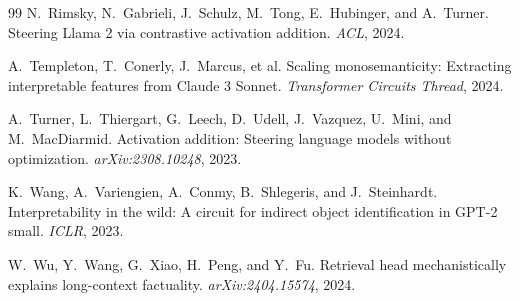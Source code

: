 \documentclass[11pt]{article}
\theoremstyle{definition}
\theoremstyle{plain}
\theoremstyle{remark}
\begin{document}
\begin{thebibliography}{99}
N.~Rimsky, N.~Gabrieli, J.~Schulz, M.~Tong, E.~Hubinger, and A.~Turner.
\newblock Steering Llama 2 via contrastive activation addition.
\newblock \emph{ACL}, 2024.

A.~Templeton, T.~Conerly, J.~Marcus, et al.
\newblock Scaling monosemanticity: Extracting interpretable features from Claude 3 Sonnet.
\newblock \emph{Transformer Circuits Thread}, 2024.

A.~Turner, L.~Thiergart, G.~Leech, D.~Udell, J.~Vazquez, U.~Mini, and M.~MacDiarmid.
\newblock Activation addition: Steering language models without optimization.
\newblock \emph{arXiv:2308.10248}, 2023.

K.~Wang, A.~Variengien, A.~Conmy, B.~Shlegeris, and J.~Steinhardt.
\newblock Interpretability in the wild: A circuit for indirect object identification in GPT-2 small.
\newblock \emph{ICLR}, 2023.

W.~Wu, Y.~Wang, G.~Xiao, H.~Peng, and Y.~Fu.
\newblock Retrieval head mechanistically explains long-context factuality.
\newblock \emph{arXiv:2404.15574}, 2024.

\end{thebibliography}
\end{document}
